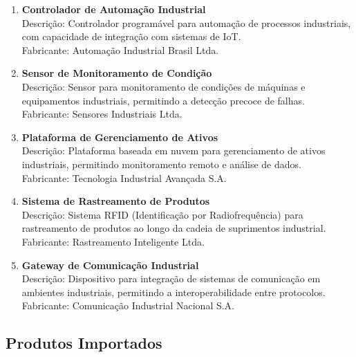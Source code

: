 \documentclass{estacio}
\begin{document}
\begin{enumerate}
    \item \textbf{Controlador de Automação Industrial}\\
    Descrição: Controlador programável para automação de processos industriais, com capacidade de integração com sistemas de IoT.\\
    Fabricante: Automação Industrial Brasil Ltda.

    \item \textbf{Sensor de Monitoramento de Condição}\\
    Descrição: Sensor para monitoramento de condições de máquinas e equipamentos industriais, permitindo a detecção precoce de falhas.\\
    Fabricante: Sensores Industriais Ltda.

    \item \textbf{Plataforma de Gerenciamento de Ativos}\\
    Descrição: Plataforma baseada em nuvem para gerenciamento de ativos industriais, permitindo monitoramento remoto e análise de dados.\\
    Fabricante: Tecnologia Industrial Avançada S.A.

    \item \textbf{Sistema de Rastreamento de Produtos}\\
    Descrição: Sistema RFID (Identificação por Radiofrequência) para rastreamento de produtos ao longo da cadeia de suprimentos industrial.\\
    Fabricante: Rastreamento Inteligente Ltda.

    \item \textbf{Gateway de Comunicação Industrial}\\
    Descrição: Dispositivo para integração de sistemas de comunicação em ambientes industriais, permitindo a interoperabilidade entre protocolos.\\
    Fabricante: Comunicação Industrial Nacional S.A.
\end{enumerate}

\subsection{Produtos Importados}
\end{document}
